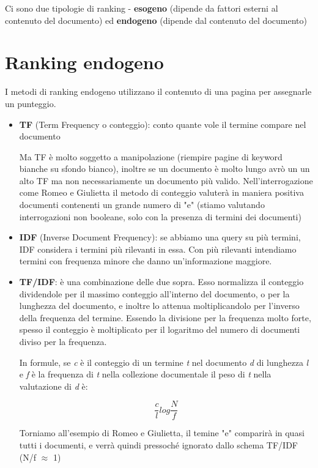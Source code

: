 \documentclass[12pt,italian]{report}
\begin{document}
Ci sono due tipologie di ranking - \textbf{esogeno} (dipende da fattori esterni al contenuto del documento) ed \textbf{endogeno} (dipende dal contenuto del documento)

\section{Ranking endogeno}
\label{ranking endogeno}
I metodi di ranking endogeno utilizzano il contenuto di una pagina per assegnarle un punteggio.

\begin{itemize}
    \item \textbf{TF} (Term Frequency o conteggio): conto quante vole il termine compare nel documento
    
    Ma TF è molto soggetto a manipolazione (riempire pagine di keyword bianche su sfondo bianco), inoltre se un documento è molto lungo avrò un un alto TF ma non necessariamente un documento più valido. Nell'interrogazione come Romeo e Giulietta il metodo di conteggio valuterà in maniera positiva documenti contenenti un grande numero di "e" (stiamo valutando interrogazioni non booleane, solo con la presenza di termini dei documenti)
    
    \item \textbf{IDF} (Inverse Document Frequency): se abbiamo una query su più termini, IDF considera i termini più rilevanti in essa. Con più rilevanti intendiamo termini con frequenza minore che danno un'informazione maggiore.
    
    \item \textbf{TF/IDF}: è una combinazione delle due sopra. Esso normalizza il conteggio dividendole per il massimo conteggio all'interno del documento, o per la lunghezza del documento, e inoltre lo attenua moltiplicandolo per l'inverso della frequenza del termine. Essendo la divisione per la frequenza molto forte, spesso il conteggio è moltiplicato per il logaritmo del numero di documenti diviso per la frequenza.
    
    In formule, se \textit{c} è il conteggio di un termine \textit{t} nel documento \textit{d} di lunghezza \textit{l} e \textit{f} è la frequenza di \textit{t} nella collezione documentale il peso di \textit{t} nella valutazione di \textit{d} è:

    \begin{equation}
        \frac{c}{l} log \frac{N}{f}
    \end{equation}
    
    Torniamo all'esempio di Romeo e Giulietta, il temine "e" comparirà in quasi tutti i documenti, e verrà quindi pressoché ignorato dallo schema TF/IDF (N/f $\approx$ 1)


\end{itemize}
\end{document}
